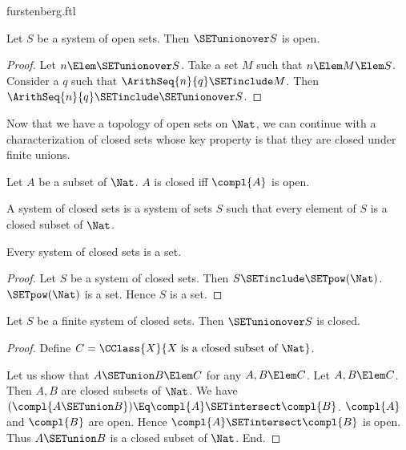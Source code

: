 \documentclass{stex}
\begin{document}
\begin{smodule}{furstenberg.ftl}
\begin{forthel}
  \begin{lemma}
    Let $S$ be a system of open sets.
    Then $\SETunionover S$ is open.
  \end{lemma}
  \begin{proof}
    Let $n \Elem \SETunionover S$.
    Take a set $M$ such that $n \Elem M \Elem S$.
    Consider a $q$ such that $\ArithSeq{n}{q} \SETinclude M$.
    Then $\ArithSeq{n}{q} \SETinclude \SETunionover S$.
  \end{proof}
\end{forthel}

Now that we have a topology of open sets on $\Nat$, we can continue
with a characterization of closed sets whose key property is that they are
closed under finite unions.

\begin{forthel}
  \begin{definition}[for=closed]
    Let $A$ be a subset of $\Nat$.
    $A$ is closed iff $\compl{A}$ is open.
  \end{definition}

  \begin{definition}[for=system of closed sets]
    A system of closed sets is a system of sets $S$ such that every element of
    $S$ is a closed subset of $\Nat$.
  \end{definition}

  \begin{lemma}
    Every system of closed sets is a set.
  \end{lemma}
  \begin{proof}
    Let $S$ be a system of closed sets.
    Then $S \SETinclude \SETpow(\Nat)$.
    $\SETpow(\Nat)$ is a set.
    Hence $S$ is a set.
  \end{proof}

  \begin{lemma}
    Let $S$ be a finite system of closed sets.
    Then $\SETunionover S$ is closed.
  \end{lemma}
  \begin{proof}
    Define $C = \CClass{X}{X \text{ is a closed subset of } \Nat}$.

    Let us show that $A \SETunion B \Elem C$ for any $A, B \Elem C$.
      Let $A, B \Elem C$.
      Then $A, B$ are closed subsets of $\Nat$.
      We have $(\compl{A \SETunion B}) \Eq \compl{A} \SETintersect \compl{B}$. %
      $\compl{A}$ and $\compl{B}$ are open.
      Hence $\compl{A} \SETintersect \compl{B}$ is open.
      Thus $A \SETunion B$ is a closed subset of $\Nat$.
    End.


\end{proof}
\end{forthel}
\end{smodule}
\end{document}
